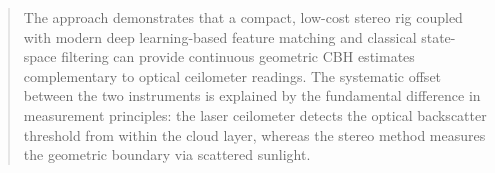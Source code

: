 \documentclass[11pt]{article}
\begin{document}
\begin{abstract}
The approach demonstrates that a compact, low-cost stereo rig coupled with modern deep learning-based feature matching and classical state-space filtering can provide continuous geometric CBH estimates complementary to optical ceilometer readings. The systematic offset between the two instruments is explained by the fundamental difference in measurement principles: the laser ceilometer detects the optical backscatter threshold from within the cloud layer, whereas the stereo method measures the geometric boundary via scattered sunlight.

\end{abstract}
\end{document}
